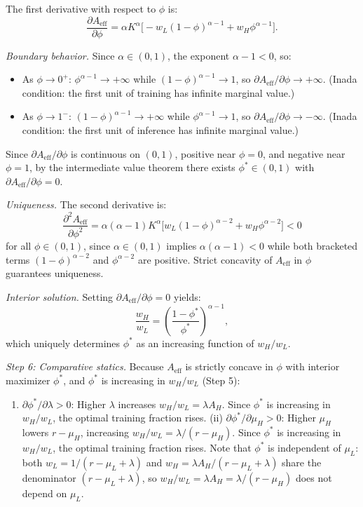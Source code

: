 \documentclass[
  11pt,
  letterpaper,
]{scrartcl}
\providecommand{\tightlist}{%
  \setlength{\itemsep}{0pt}\setlength{\parskip}{0pt}}
\begin{document}
The first derivative with respect to \(\phi\) is: \[
\frac{\partial A_{\text{eff}}}{\partial \phi} = \alpha K^\alpha \bigl[-w_L (1-\phi)^{\alpha - 1} + w_H \phi^{\alpha - 1}\bigr].
\]

\emph{Boundary behavior.} Since \(\alpha \in (0,1)\), the exponent
\(\alpha - 1 < 0\), so:

\begin{itemize}
\tightlist
\item
  As \(\phi \to 0^+\): \(\phi^{\alpha - 1} \to +\infty\) while
  \((1-\phi)^{\alpha-1} \to 1\), so
  \(\partial A_{\text{eff}}/\partial \phi \to +\infty\). (Inada
  condition: the first unit of training has infinite marginal value.)
\item
  As \(\phi \to 1^-\): \((1-\phi)^{\alpha - 1} \to +\infty\) while
  \(\phi^{\alpha-1} \to 1\), so
  \(\partial A_{\text{eff}}/\partial \phi \to -\infty\). (Inada
  condition: the first unit of inference has infinite marginal value.)
\end{itemize}

Since \(\partial A_{\text{eff}}/\partial \phi\) is continuous on
\((0,1)\), positive near \(\phi = 0\), and negative near \(\phi = 1\),
by the intermediate value theorem there exists \(\phi^* \in (0,1)\) with
\(\partial A_{\text{eff}}/\partial \phi = 0\).

\emph{Uniqueness.} The second derivative is: \[
\frac{\partial^2 A_{\text{eff}}}{\partial \phi^2} = \alpha(\alpha - 1) K^\alpha \bigl[w_L (1-\phi)^{\alpha - 2} + w_H \phi^{\alpha - 2}\bigr] < 0
\] for all \(\phi \in (0,1)\), since \(\alpha \in (0,1)\) implies
\(\alpha(\alpha-1) < 0\) while both bracketed terms
\((1-\phi)^{\alpha - 2}\) and \(\phi^{\alpha - 2}\) are positive. Strict
concavity of \(A_{\text{eff}}\) in \(\phi\) guarantees uniqueness.

\emph{Interior solution.} Setting
\(\partial A_{\text{eff}} / \partial \phi = 0\) yields: \[
\frac{w_H}{w_L} = \left(\frac{1-\phi^*}{\phi^*}\right)^{\alpha - 1},
\] which uniquely determines \(\phi^*\) as an increasing function of
\(w_H / w_L\).

\emph{Step 6: Comparative statics.} Because \(A_{\text{eff}}\) is
strictly concave in \(\phi\) with interior maximizer \(\phi^*\), and
\(\phi^*\) is increasing in \(w_H/w_L\) (Step 5):

\begin{enumerate}
\def\labelenumi{(\roman{enumi})}
\tightlist
\item
  \(\partial \phi^* / \partial \lambda > 0\): Higher \(\lambda\)
  increases \(w_H / w_L = \lambda A_H\). Since \(\phi^*\) is increasing
  in \(w_H / w_L\), the optimal training fraction rises. (ii)
  \(\partial \phi^* / \partial \mu_H > 0\): Higher \(\mu_H\) lowers
  \(r - \mu_H\), increasing \(w_H / w_L = \lambda / (r - \mu_H)\). Since
  \(\phi^*\) is increasing in \(w_H / w_L\), the optimal training
  fraction rises. Note that \(\phi^*\) is independent of \(\mu_L\): both
  \(w_L = 1/(r - \mu_L + \lambda)\) and
  \(w_H = \lambda A_H / (r - \mu_L + \lambda)\) share the denominator
  \((r - \mu_L + \lambda)\), so
  \(w_H / w_L = \lambda A_H = \lambda / (r - \mu_H)\) does not depend on
  \(\mu_L\).
\end{enumerate}
\end{document}
